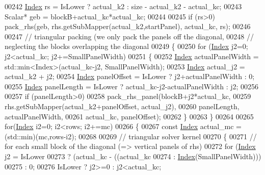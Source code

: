 \begin{DoxyCode}
00242       \hyperlink{namespace_eigen_a62e77e0933482dafde8fe197d9a2cfde}{Index} rs = IsLower ? actual\_k2 : size - actual\_k2 - actual\_kc;
00243       Scalar* geb = blockB+actual\_kc*actual\_kc;
00244 
00245       \textcolor{keywordflow}{if} (rs>0) pack\_rhs(geb, rhs.getSubMapper(actual\_k2,startPanel), actual\_kc, rs);
00246 
00247       \textcolor{comment}{// triangular packing (we only pack the panels off the diagonal,}
00248       \textcolor{comment}{// neglecting the blocks overlapping the diagonal}
00249       \{
00250         \textcolor{keywordflow}{for} (\hyperlink{namespace_eigen_a62e77e0933482dafde8fe197d9a2cfde}{Index} j2=0; j2<actual\_kc; j2+=SmallPanelWidth)
00251         \{
00252           \hyperlink{namespace_eigen_a62e77e0933482dafde8fe197d9a2cfde}{Index} actualPanelWidth = std::min<Index>(actual\_kc-j2, SmallPanelWidth);
00253           \hyperlink{namespace_eigen_a62e77e0933482dafde8fe197d9a2cfde}{Index} actual\_j2 = actual\_k2 + j2;
00254           \hyperlink{namespace_eigen_a62e77e0933482dafde8fe197d9a2cfde}{Index} panelOffset = IsLower ? j2+actualPanelWidth : 0;
00255           \hyperlink{namespace_eigen_a62e77e0933482dafde8fe197d9a2cfde}{Index} panelLength = IsLower ? actual\_kc-j2-actualPanelWidth : j2;
00256 
00257           \textcolor{keywordflow}{if} (panelLength>0)
00258           pack\_rhs\_panel(blockB+j2*actual\_kc,
00259                          rhs.getSubMapper(actual\_k2+panelOffset, actual\_j2),
00260                          panelLength, actualPanelWidth,
00261                          actual\_kc, panelOffset);
00262         \}
00263       \}
00264 
00265       \textcolor{keywordflow}{for}(\hyperlink{namespace_eigen_a62e77e0933482dafde8fe197d9a2cfde}{Index} i2=0; i2<rows; i2+=mc)
00266       \{
00267         \textcolor{keyword}{const} \hyperlink{namespace_eigen_a62e77e0933482dafde8fe197d9a2cfde}{Index} actual\_mc = (std::min)(mc,rows-i2);
00268 
00269         \textcolor{comment}{// triangular solver kernel}
00270         \{
00271           \textcolor{comment}{// for each small block of the diagonal (=> vertical panels of rhs)}
00272           \textcolor{keywordflow}{for} (\hyperlink{namespace_eigen_a62e77e0933482dafde8fe197d9a2cfde}{Index} j2 = IsLower
00273                       ? (actual\_kc - ((actual\_kc%
00274                                                                   : \hyperlink{namespace_eigen_a62e77e0933482dafde8fe197d9a2cfde}{Index}(SmallPanelWidth)))
00275                       : 0;
00276                IsLower ? j2>=0 : j2<actual\_kc;

\end{DoxyCode}
